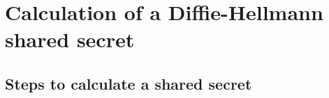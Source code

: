 \chapter{Calculation of a Diffie-Hellmann shared secret}
\label{dhSec}

\section{Steps to calculate a shared secret}